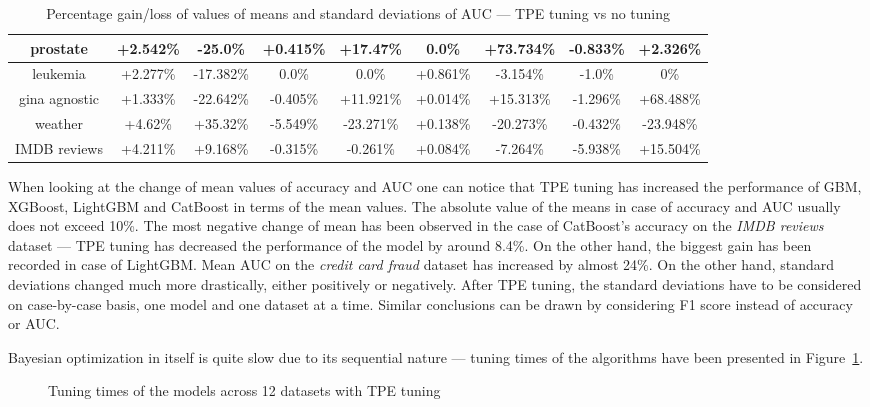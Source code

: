 \documentclass[magisterska, english]{pwr_wmat_praca_dyplomowa}
\theoremstyle{plain}
\numberwithin{theorem}{chapter}
\theoremstyle{definition}
\numberwithin{theorem}{chapter}
\begin{document}
\begin{sidewaystable}
\begin{tabular}{c|cccccccc}
prostate & +2.542\% & -25.0\% & +0.415\% & +17.47\% & 0.0\% & +73.734\% & -0.833\% & +2.326\%\\ \hline
leukemia & +2.277\% & -17.382\% & 0.0\% & 0.0\% & +0.861\% & -3.154\% & -1.0\% & 0\%\\ \hline
gina agnostic & +1.333\% & -22.642\% & -0.405\% & +11.921\% & +0.014\% & +15.313\% & -1.296\% & +68.488\%\\ \hline
weather & +4.62\% & +35.32\% & -5.549\% & -23.271\% & +0.138\% & -20.273\% & -0.432\% & -23.948\%\\ \hline
IMDB reviews & +4.211\% & +9.168\% & -0.315\% & -0.261\% & +0.084\% & -7.264\% & -5.938\% & +15.504\%\\ \hline
\end{tabular}
\caption{Percentage gain/loss of values of means and standard deviations of AUC --- TPE tuning vs no tuning}
\label{tab:no_tuning_tpe_AUC_diff}
   \end{sidewaystable}

When looking at the change of mean values of accuracy and AUC one can notice that TPE tuning has increased the performance of GBM, XGBoost, LightGBM and CatBoost in terms of the mean values. The absolute value of the means in case of accuracy and AUC usually does not exceed 10\%. The most negative change of mean has been observed in the case of CatBoost's accuracy on the \emph{IMDB reviews} dataset --- TPE tuning has decreased the performance of the model by around 8.4\%. On the other hand, the biggest gain has been recorded in case of LightGBM. Mean AUC on the \emph{credit card fraud} dataset has increased by almost 24\%. On the other hand, standard deviations changed much more drastically, either positively or negatively. After TPE tuning, the standard deviations have to be considered on case-by-case basis, one model and one dataset at a time. Similar conclusions can be drawn by considering F1 score instead of accuracy or AUC.

Bayesian optimization in itself is quite slow due to its sequential nature --- tuning times of the algorithms have been presented in Figure~\ref{fig:tpe_tuning_times}.

\begin{figure}[H]
	\centering
	\caption{Tuning times of the models across 12 datasets with TPE tuning}
	\label{fig:tpe_tuning_times}
\end{figure}
\end{document}
